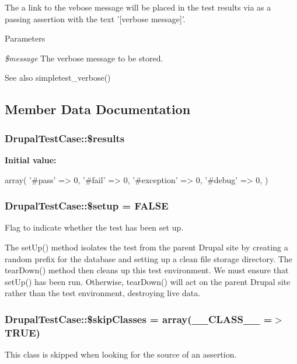 The a link to the vebose message will be placed in the test results via as a passing assertion with the text '\mbox{[}verbose message\mbox{]}'.


\begin{DoxyParams}{Parameters}
\item[{\em \$message}]The verbose message to be stored.\end{DoxyParams}
\begin{DoxySeeAlso}{See also}
simpletest\_\-verbose() 
\end{DoxySeeAlso}


\subsection{Member Data Documentation}
\hypertarget{classDrupalTestCase_a0367dfff47c6fd9879879fd145f2cc30}{
\subsubsection[{\$results}]{\setlength{\rightskip}{0pt plus 5cm}DrupalTestCase::\$results}}
\label{classDrupalTestCase_a0367dfff47c6fd9879879fd145f2cc30}
{\bfseries Initial value:}
\begin{DoxyCode}
 array(
    '#pass' => 0,
    '#fail' => 0,
    '#exception' => 0,
    '#debug' => 0,
  )
\end{DoxyCode}
\hypertarget{classDrupalTestCase_a3a4fcc47d7c5768a93169285fa46a3fb}{
\subsubsection[{\$setup}]{\setlength{\rightskip}{0pt plus 5cm}DrupalTestCase::\$setup = FALSE}}
\label{classDrupalTestCase_a3a4fcc47d7c5768a93169285fa46a3fb}
Flag to indicate whether the test has been set up.

The setUp() method isolates the test from the parent Drupal site by creating a random prefix for the database and setting up a clean file storage directory. The tearDown() method then cleans up this test environment. We must ensure that setUp() has been run. Otherwise, tearDown() will act on the parent Drupal site rather than the test environment, destroying live data. \hypertarget{classDrupalTestCase_a2b29918aec212576b048e0ffa8fd5b89}{
\subsubsection[{\$skipClasses}]{\setlength{\rightskip}{0pt plus 5cm}DrupalTestCase::\$skipClasses = array(\_\-\_\-CLASS\_\-\_\- =$>$ TRUE)}}
\label{classDrupalTestCase_a2b29918aec212576b048e0ffa8fd5b89}
This class is skipped when looking for the source of an assertion.

